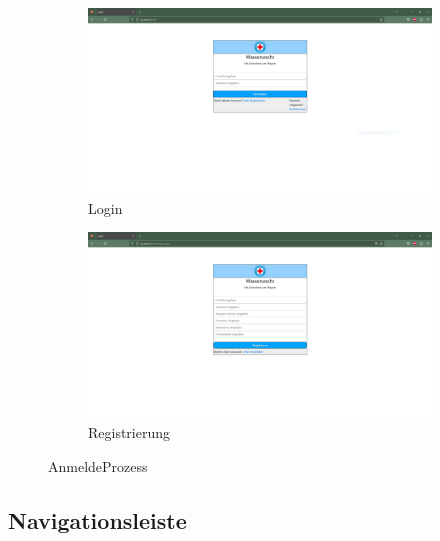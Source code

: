 \documentclass[fontsize=12pt,openright,oneside,paper=a4,BCOR=1cm]{scrbook}
\begin{document}
\begin{figure}[H]
  \centering
  \begin{subfigure}[b]{0.7\linewidth}
    \includegraphics[width=\linewidth]{Anlagen/Anwendung/1Login.png}
    \caption{Login}
  \end{subfigure}
  \begin{subfigure}[b]{0.7\linewidth}
    \includegraphics[width=\linewidth]{Anlagen/Anwendung/2Registrieren.png}
    \caption{Registrierung}
  \end{subfigure}
  \caption{AnmeldeProzess}
  \label{fig:anwendung-anmeldeprozess}
\end{figure}

\subsection{Navigationsleiste}

\end{document}
